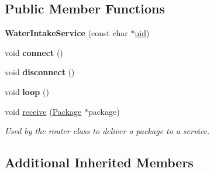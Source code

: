 \subsection*{Public Member Functions}
\begin{DoxyCompactItemize}
\item 
{\bfseries Water\+Intake\+Service} (const char $\ast$\hyperlink{class_bottle_buddy_1_1_embedded_1_1_pipeline_1_1_service_af290f9aa0a6dca36e802e615fab19f78}{uid})\hypertarget{class_bottle_buddy_1_1_embedded_1_1_pipeline_1_1_services_1_1_water_intake_service_a0a7366a3c4ea9c7720a5a18129fac62f}{}\label{class_bottle_buddy_1_1_embedded_1_1_pipeline_1_1_services_1_1_water_intake_service_a0a7366a3c4ea9c7720a5a18129fac62f}

\item 
void {\bfseries connect} ()\hypertarget{class_bottle_buddy_1_1_embedded_1_1_pipeline_1_1_services_1_1_water_intake_service_a8eb71ebb9cd53e68847fdc67adc54ae9}{}\label{class_bottle_buddy_1_1_embedded_1_1_pipeline_1_1_services_1_1_water_intake_service_a8eb71ebb9cd53e68847fdc67adc54ae9}

\item 
void {\bfseries disconnect} ()\hypertarget{class_bottle_buddy_1_1_embedded_1_1_pipeline_1_1_services_1_1_water_intake_service_a43c5c1869c79079fcfd8d6b7bdd10821}{}\label{class_bottle_buddy_1_1_embedded_1_1_pipeline_1_1_services_1_1_water_intake_service_a43c5c1869c79079fcfd8d6b7bdd10821}

\item 
void {\bfseries loop} ()\hypertarget{class_bottle_buddy_1_1_embedded_1_1_pipeline_1_1_services_1_1_water_intake_service_adbc1a38d314fb9d071719ebc69fe1a71}{}\label{class_bottle_buddy_1_1_embedded_1_1_pipeline_1_1_services_1_1_water_intake_service_adbc1a38d314fb9d071719ebc69fe1a71}

\item 
void \hyperlink{class_bottle_buddy_1_1_embedded_1_1_pipeline_1_1_services_1_1_water_intake_service_abfa1b38af16fae314c3ba3f80b2bf785}{receive} (\hyperlink{class_bottle_buddy_1_1_embedded_1_1_pipeline_1_1_package}{Package} $\ast$package)
\begin{DoxyCompactList}\small\item\em Used by the router class to deliver a package to a service. \end{DoxyCompactList}\end{DoxyCompactItemize}
\subsection*{Additional Inherited Members}


